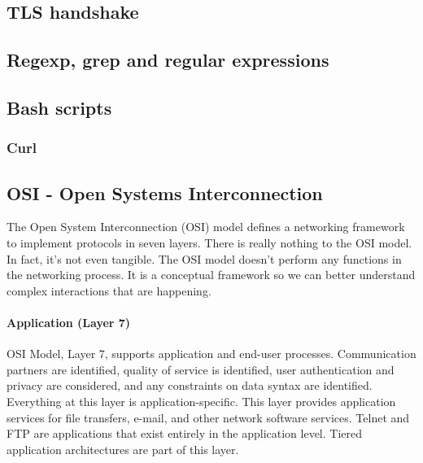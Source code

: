 \documentclass{article}[12pt]
\begin{document}
\subsection{TLS handshake}

\subsection{Regexp, grep and regular expressions}
\subsection{Bash scripts}
\subsubsection{Curl}
\label{subsubsec:curl}




\subsection{OSI - Open Systems Interconnection \cite{osi} }
\label{subsec:osi}
The Open System Interconnection (OSI) model defines a networking framework to implement protocols in seven layers.
There is really nothing to the OSI model.
In fact, it's not even tangible.
The OSI model doesn't perform any functions in the networking process.
It is a conceptual framework so we can better understand complex interactions that are happening.


\paragraph{Application (Layer 7)}

OSI Model, Layer 7, supports application and end-user processes.
Communication partners are identified, quality of service is identified, user authentication and privacy are considered, and any constraints on data syntax are identified.
Everything at this layer is application-specific.
This layer provides application services for file transfers, e-mail, and other network software services.
Telnet and FTP are applications that exist entirely in the application level.
Tiered application architectures are part of this layer.
\end{document}
